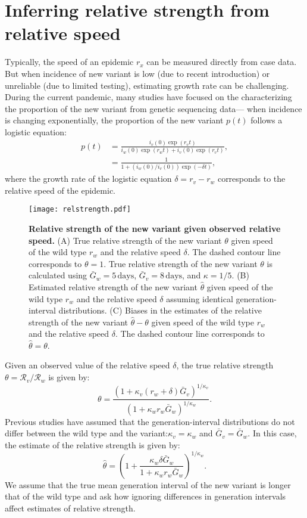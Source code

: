 \documentclass[12pt]{article}
\newcommand{\RR}{\ensuremath{{\mathcal R}}\xspace}
\begin{document}
\section{Inferring relative strength from relative speed}

Typically, the speed of an epidemic $r_x$ can be measured directly from case data.
But when incidence of new variant is low (due to recent introduction) or unreliable (due to limited testing), estimating growth rate can be challenging.
During the current pandemic, many studies have focused on the characterizing the proportion of the new variant from genetic sequencing data---
when incidence is changing exponentially, the proportion of the new variant $p(t)$ follows a logistic equation:
\begin{align}
p(t) &= \frac{i_v(0) \exp(r_v t)}{i_w(0) \exp(r_w t) + i_v(0) \exp(r_v t)},\\
&= \frac{1}{1 + \left(i_w(0)/i_v(0)\right) \exp(-\delta t)},
\end{align}
where the growth rate of the logistic equation $\delta = r_v - r_w$ corresponds to the relative speed of the epidemic.

\begin{figure}[!th]
\texttt{[image: relstrength.pdf]}
\caption{
\textbf{Relative strength of the new variant given observed relative speed.}
(A) True relative strength of the new variant $\theta$ given speed of the wild type $r_w$ and the relative speed $\delta$.
The dashed contour line corresponds to $\theta = 1$.
True relative strength of the new variant $\theta$ is calculated using $\bar{G}_w = 5\,\textrm{days}$, $\bar{G}_v = 8\,\textrm{days}$, and $\kappa = 1/5$. 
(B) Estimated relative strength of the new variant $\hat{\theta}$ given speed of the wild type
$r_w$ and the relative speed $\delta$ assuming identical generation-interval distributions.
(C) Biases in the estimates of the relative strength of the new variant $\hat{\theta} - \theta$ given speed of the wild type $r_w$ and the relative speed $\delta$.
The dashed contour line corresponds to $\hat{\theta} = \theta$.
}
\label{fig:relstrength}
\end{figure}

Given an observed value of the relative speed $\delta$, the true relative strength $\theta = \RR_v/\RR_w$ is given by:
\begin{equation}
\theta = \frac{(1 + \kappa_v (r_w + \delta) \bar{G}_v)^{1/\kappa_v}}{(1 + \kappa_w r_w \bar{G}_w)^{1/\kappa_w}}.
\end{equation}
Previous studies have assumed that the generation-interval distributions do not differ between the wild type and the variant:$\kappa_v = \kappa_w$ and $\bar{G}_v = \bar{G}_w$.
In this case, the estimate of the relative strength is given by:
\begin{equation}
\hat{\theta} = \left(1 + \frac{\kappa_w \delta \bar{G}_w}{1 + \kappa_w r_w \bar{G}_w}\right)^{1/\kappa_w}.
\end{equation}
We assume that the true mean generation interval of the new variant is longer that of the wild type and ask how ignoring differences in generation intervals affect estimates of relative strength.
\end{document}
